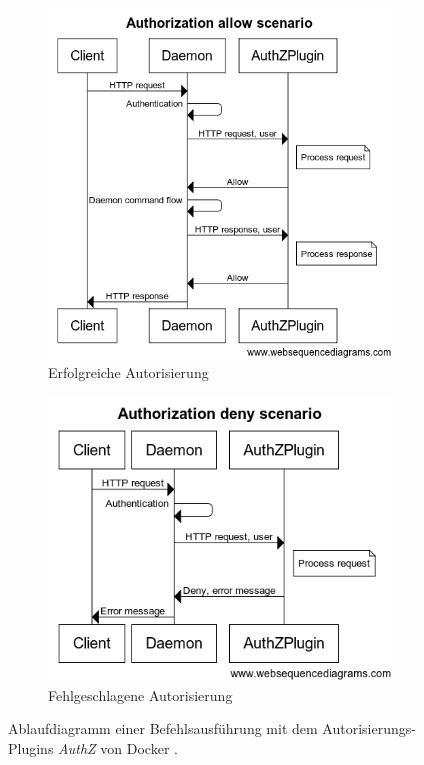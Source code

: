\documentclass[../main.tex]{subfiles}
\begin{document}
    \begin{figure}
      \centering
      \begin{subfigure}{.5\textwidth}
        \centering
        \includegraphics[width=1.0\linewidth]{./images/sec_authzAllow.png}
        \caption{Erfolgreiche Autorisierung}
        \label{fig:sec_authzAllow}
      \end{subfigure}%
      \begin{subfigure}{.5\textwidth}
        \centering
        \includegraphics[width=1.0\linewidth]{./images/sec_authzDeny.png}
        \caption{Fehlgeschlagene Autorisierung}
        \label{fig:sec_authzDeny}
      \end{subfigure}
      \caption{Ablaufdiagramm einer Befehlsausführung mit dem Autorisierungs-Plugins \emph{AuthZ} von Docker \cite{githubAuthZExtended}.}
      \label{fig:sec_authz}
    \end{figure}
\end{document}
